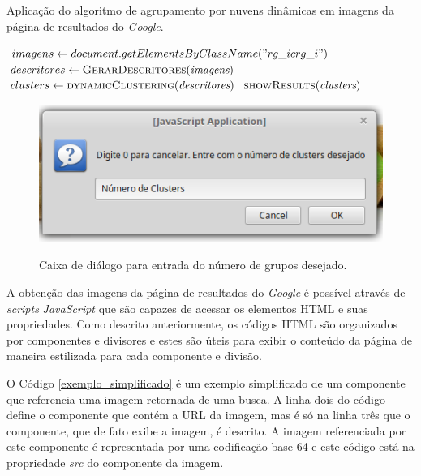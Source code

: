 \begin{algorithm}[htb]
\caption{Aplicação do algoritmo de agrupamento por nuvens dinâmicas em imagens da página de resultados do \emph{Google}.}
\label{algo_base}
	\begin{algorithmic}[1]
				\State $imagens \gets document.getElementsByClassName("rg\_ic rg\_i")$
				\State $descritores \gets \Call{GerarDescritores}{\emph{imagens}}$
				\State $clusters \gets \Call{dynamicClustering}{\emph{descritores}}$
				\State $\Call{showResults}{\emph{clusters}}$
			\EndIf
		\EndFunction
	\end{algorithmic}
\end{algorithm}

\begin{figure}[htb]
\begin{center}
  \centering
  \caption{Caixa de diálogo para entrada do número de grupos desejado.}
      \includegraphics[scale=0.6]{images/input.png}
    
    \label{input}
  
\end{center}

\end{figure}

A obtenção das imagens da página de resultados do \emph{Google} é possível através de \emph{scripts} \emph{JavaScript} que são capazes de acessar os elementos HTML e suas propriedades. Como descrito anteriormente, os códigos HTML são organizados por componentes e divisores e estes são úteis para exibir o conteúdo da página de maneira estilizada para cada componente e divisão.

O Código \ref{exemplo_simplificado} é um exemplo simplificado de um componente que referencia uma imagem retornada de uma busca. A linha dois do código define o componente que contém a URL da imagem, mas é só na linha três que o componente, que de fato exibe a imagem, é descrito. A imagem referenciada por este componente é representada por uma codificação base 64 e este código está na propriedade \emph{src} do componente da imagem.  


